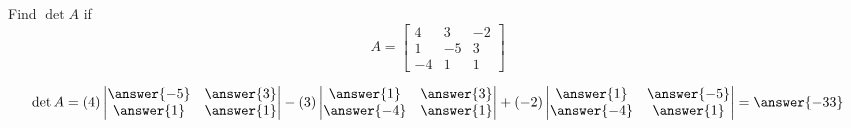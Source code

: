 \documentclass{ximera}
\begin{document}
\begin{example}\label{ex:3x3det2}
Find $\det{A}$ if 
$$A=\begin{bmatrix}4&3&-2\\1&-5&3\\-4&1&1\end{bmatrix}$$
\begin{explanation}
$$
\det{A}=(4)\begin{vmatrix}\answer{-5}&\answer{3}\\\answer{1}&\answer{1}\end{vmatrix}-(3)\begin{vmatrix}\answer{1}&\answer{3}\\\answer{-4}&\answer{1}\end{vmatrix}+(-2)\begin{vmatrix}\answer{1}&\answer{-5}\\\answer{-4}&\answer{1}\end{vmatrix}
=\answer{-33}
$$
\end{explanation}
\end{example}
\end{document}
